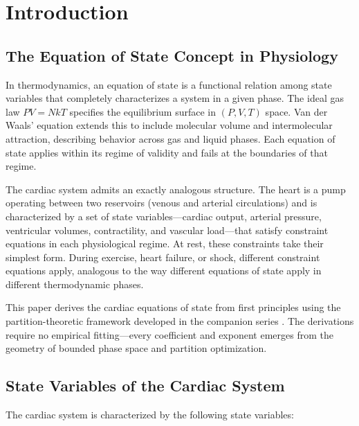 \documentclass[12pt,a4paper]{article}
\theoremstyle{remark}
\begin{document}
\section{Introduction}
\label{sec:introduction}

\subsection{The Equation of State Concept in Physiology}

In thermodynamics, an equation of state is a functional relation among state variables that completely characterizes a system in a given phase. The ideal gas law $PV = NkT$ specifies the equilibrium surface in $(P, V, T)$ space. Van der Waals' equation extends this to include molecular volume and intermolecular attraction, describing behavior across gas and liquid phases. Each equation of state applies within its regime of validity and fails at the boundaries of that regime.

The cardiac system admits an exactly analogous structure. The heart is a pump operating between two reservoirs (venous and arterial circulations) and is characterized by a set of state variables—cardiac output, arterial pressure, ventricular volumes, contractility, and vascular load—that satisfy constraint equations in each physiological regime. At rest, these constraints take their simplest form. During exercise, heart failure, or shock, different constraint equations apply, analogous to the way different equations of state apply in different thermodynamic phases.

This paper derives the cardiac equations of state from first principles using the partition-theoretic framework developed in the companion series \cite{sachikonye2024transport,sachikonye2024gas,sachikonye2024mass,sachikonye2024cardio}. The derivations require no empirical fitting—every coefficient and exponent emerges from the geometry of bounded phase space and partition optimization.

\subsection{State Variables of the Cardiac System}

The cardiac system is characterized by the following state variables:
\end{document}
